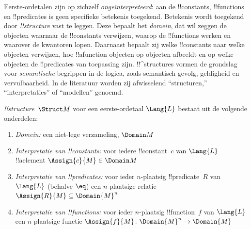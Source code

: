 \documentclass[../../../include/open-logic-section]{subfiles}
\begin{document}


\begin{explain}
Eerste-ordetalen zijn op zichzelf \emph{ongeïnterpreteerd}: aan de
!!{constant}s, !!{function}s en !!{predicate}s is geen specifieke
betekenis toegekend. Betekenis wordt toegekend door
 \emph{!!{structure}} vast te leggen. Deze bepaalt
het \emph{domein}, dat wil zeggen de objecten waarnaar de !!{constant}s
verwijzen, waarop de !!{function}s werken en waarover de kwantoren
lopen. Daarnaast bepaalt zij welke !!{constant}s naar welke objecten
verwijzen, hoe !!a{function} objecten op objecten afbeeldt en op welke
objecten de !!{predicate}s van toepassing zijn. !!^{structure}s vormen
de grondslag voor \emph{semantische} begrippen in de logica, zoals
semantisch gevolg, geldigheid en vervulbaarheid. In de literatuur
worden zij afwisselend ``structuren,'' ``interpretaties'' of
``modellen'' genoemd.
\end{explain}

\begin{defn}[!!^{structure}s]
 \emph{!!{structure}}~$\Struct M$ voor een
eerste-ordetaal $\Lang{L}$ bestaat uit de volgende onderdelen:
\begin{enumerate}
\item \emph{Domein:} een niet-lege verzameling, $\Domain M$
\item \emph{Interpretatie van !!{constant}s:} voor iedere
  !!{constant}~$c$ van $\Lang{L}$ !!a{element}
  $\Assign{c}{M} \in \Domain M$
\item \emph{Interpretatie van !!{predicate}s:} voor ieder $n$-plaatsig
  !!{predicate}~$R$ van $\Lang{L}$ (behalve $\eq$) een $n$-plaatsige
  relatie $\Assign{R}{M} \subseteq \Domain{M}^n$
\item \emph{Interpretatie van !!{function}s:} voor ieder $n$-plaatsig
  !!{function}~$f$ van $\Lang{L}$ een $n$-plaatsige functie
  $\Assign{f}{M} \colon \Domain{M}^n \to \Domain{M}$
\end{enumerate}
\end{defn}
\end{document}
